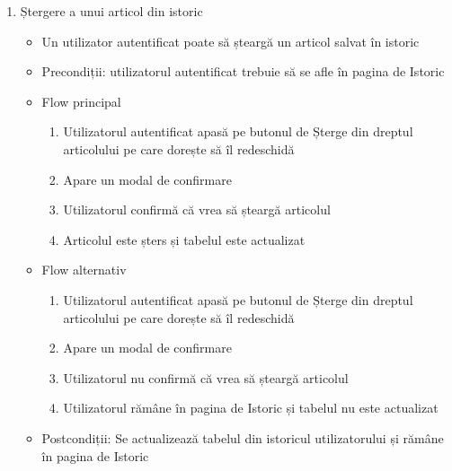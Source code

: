 \begin{enumerate}
    \item Ștergere a unui articol din istoric
    \begin{itemize}
        \setlength\itemsep{0.5em}
        \item Un utilizator autentificat poate să șteargă un articol salvat în istoric
        \item Precondiții: utilizatorul autentificat trebuie să se afle în pagina de Istoric
        \item Flow principal
        \begin{enumerate}
            \setlength\itemsep{0.5em}
            \item Utilizatorul autentificat apasă pe butonul de Șterge din dreptul articolului pe care dorește să îl redeschidă
            \item Apare un modal de confirmare
            \item Utilizatorul confirmă că vrea să șteargă articolul
            \item Articolul este șters și tabelul este actualizat
        \end{enumerate}
        \item Flow alternativ
        \begin{enumerate}
            \setlength\itemsep{0.5em}
            \item Utilizatorul autentificat apasă pe butonul de Șterge din dreptul articolului pe care dorește să îl redeschidă
            \item Apare un modal de confirmare
            \item Utilizatorul nu confirmă că vrea să șteargă articolul
            \item Utilizatorul rămâne în pagina de Istoric și tabelul nu este actualizat
        \end{enumerate}
        \item Postcondiții: Se actualizează tabelul din istoricul utilizatorului și rămâne în pagina de Istoric
    \end{itemize}


\end{enumerate}
